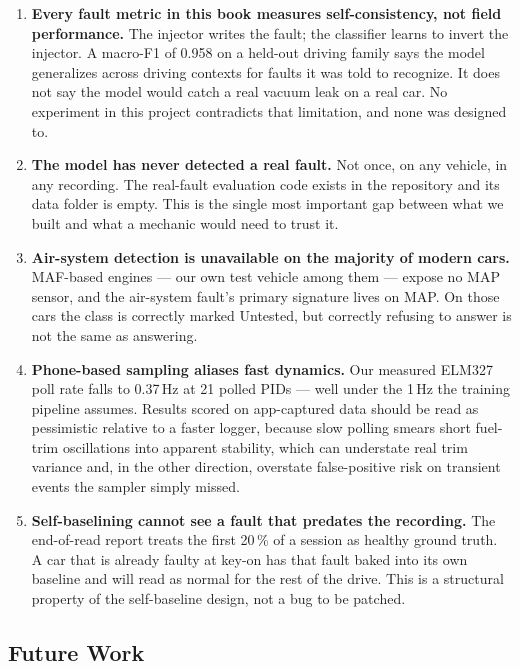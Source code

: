 \begin{enumerate}
  \item \textbf{Every fault metric in this book measures self-consistency,
    not field performance.} The injector writes the fault; the classifier
    learns to invert the injector. A macro-F1 of 0.958 on a held-out
    driving family says the model generalizes across driving contexts for
    faults it was told to recognize. It does not say the model would catch
    a real vacuum leak on a real car. No experiment in this project
    contradicts that limitation, and none was designed to.
  \item \textbf{The model has never detected a real fault.} Not once, on
    any vehicle, in any recording. The real-fault evaluation code exists
    in the repository and its data folder is empty. This is the single
    most important gap between what we built and what a mechanic would need
    to trust it.
  \item \textbf{Air-system detection is unavailable on the majority of
    modern cars.} MAF-based engines --- our own test vehicle among them ---
    expose no MAP sensor, and the air-system fault's primary signature
    lives on MAP. On those cars the class is correctly marked Untested, but
    correctly refusing to answer is not the same as answering.
  \item \textbf{Phone-based sampling aliases fast dynamics.} Our measured
    ELM327 poll rate falls to 0.37\,Hz at 21 polled PIDs --- well under the
    1\,Hz the training pipeline assumes. Results scored on app-captured
    data should be read as pessimistic relative to a faster logger, because
    slow polling smears short fuel-trim oscillations into apparent
    stability, which can understate real trim variance and, in the other
    direction, overstate false-positive risk on transient events the
    sampler simply missed.
  \item \textbf{Self-baselining cannot see a fault that predates the
    recording.} The end-of-read report treats the first 20\,\% of a session
    as healthy ground truth. A car that is already faulty at key-on has
    that fault baked into its own baseline and will read as normal for the
    rest of the drive. This is a structural property of the self-baseline
    design, not a bug to be patched.
\end{enumerate}

\subsection{Future Work}
\label{sec:future}

